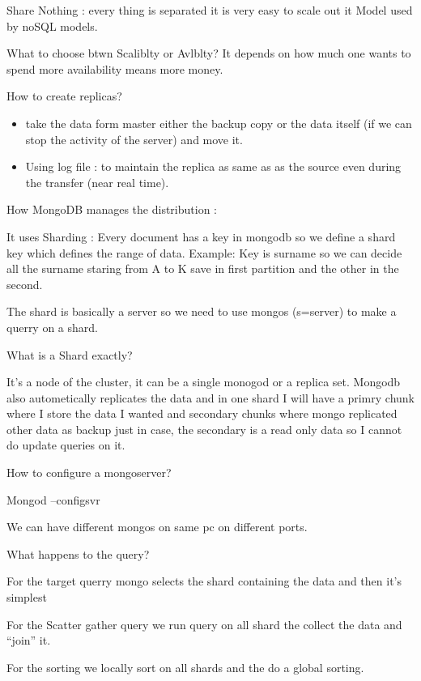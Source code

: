 \documentclass[a4page, 11pt]{article}
\begin{document}
Share Nothing : every thing is separated it is very easy to scale out it Model used by noSQL models.

What to choose btwn Scaliblty or Avlblty? It depends on how much one wants to spend more availability means more money.

How to create replicas?
\begin{itemize}[noitemsep]
	\item take the data form master either the backup copy or the data itself	(if we can stop the activity of the server) and move it.
	\item Using log file : to maintain the replica as same as as the source even during the transfer (near real time).
\end{itemize}




How MongoDB manages the distribution :

It uses Sharding : Every document has a key in mongodb so we define a shard key which defines the range of data. 
Example: Key is surname so we can decide all the surname staring from A to K save in first partition and
the other in the second.

The shard is basically a server so we need to use mongos (s=server) to make a querry on a shard.

What is a Shard exactly?

It's a node of the cluster, it can be a single monogod or a replica set. 
Mongodb also autometically replicates the data and in one shard I will have a primry chunk where I store the data I wanted and secondary chunks where mongo replicated other data as backup just in case, the secondary is a read only data so I cannot do update queries on it.

How to configure a mongoserver?

Mongod --configsvr

We can have different mongos on same pc on different ports.

What happens to the query?

For the target querry mongo selects the shard containing the data and then it's simplest

For the Scatter gather query we run query on all shard the collect the data and ``join'' it.

For the sorting we locally sort on all shards and the do a global sorting.
\end{document}
